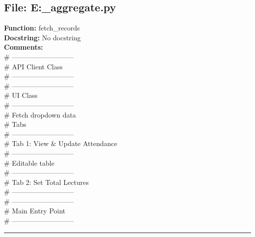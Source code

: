 {\subsection*{File: E:\project\capstone\frontend\faculty\attendance_aggregate.py}
\textbf{Function:} fetch_records\\
\textbf{Docstring:} No docstring\\
\textbf{Comments:}\\
# ---------------------------\\
# API Client Class\\
# ---------------------------\\
# ---------------------------\\
# UI Class\\
# ---------------------------\\
# Fetch dropdown data\\
# Tabs\\
# ---------------------------\\
# Tab 1: View & Update Attendance\\
# ---------------------------\\
# Editable table\\
# ---------------------------\\
# Tab 2: Set Total Lectures\\
# ---------------------------\\
# ---------------------------\\
# Main Entry Point\\
# ---------------------------\\

\hrule

}

